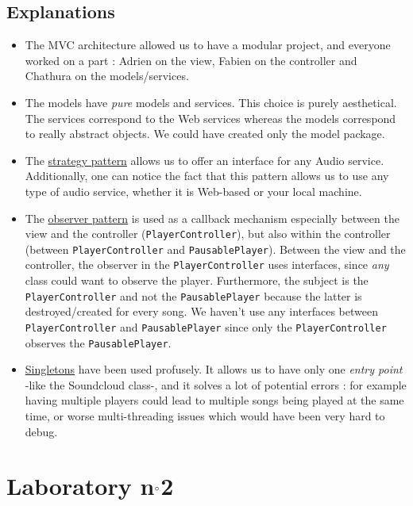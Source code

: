 \documentclass{report}
\begin{document}
\subsection{Explanations}

\begin{itemize}
\item The MVC architecture allowed us to have a modular project, and everyone worked on a part : Adrien on the view, Fabien on the controller and Chathura on the models/services. 
\item The models have \textit{pure} models and services. This choice is purely aesthetical. The services correspond to the Web services whereas the models correspond to really abstract objects. We could have created only the model package.
\item The \href{https://en.wikipedia.org/wiki/Strategy_pattern}{strategy pattern} allows us to offer an interface for any Audio service. Additionally, one can notice the fact that this pattern allows us to use any type of audio service, whether it is Web-based or your local machine.
\item The \href{https://en.wikipedia.org/wiki/Observer_pattern}{observer pattern} is used as a callback mechanism especially between the view and the controller (\texttt{PlayerController}), but also within the controller (between \texttt{PlayerController} and \texttt{PausablePlayer}). Between the view and the controller, the observer in the \texttt{PlayerController} uses interfaces, since \textit{any} class could want to observe the player. Furthermore, the subject is the \texttt{PlayerController} and not the \texttt{PausablePlayer} because the latter is destroyed/created for every song. We haven't use any interfaces between \texttt{PlayerController} and \texttt{PausablePlayer} since only the \texttt{PlayerController} observes the \texttt{PausablePlayer}.
\item \href{http://weknowmemes.com/generator/uploads/generated/g1406353714448670979.jpg}{Singletons} have been used profusely. It allows us to have only one \textit{entry point} -like the Soundcloud class-, and it solves a lot of potential errors : for example having multiple players could lead to multiple songs being played at the same time, or worse multi-threading issues which would have been very hard to debug. 
\end{itemize}

\section{Laboratory n$\degree$2}
\end{document}
